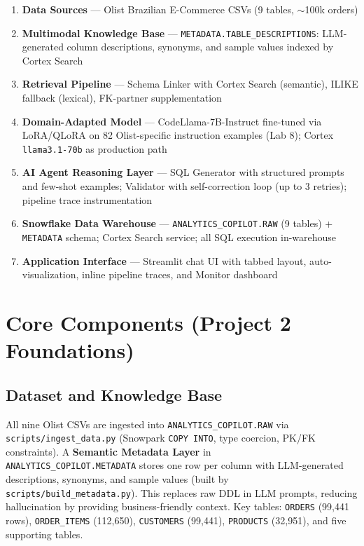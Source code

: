 \documentclass[11pt,letterpaper]{article}
\begin{document}
\begin{enumerate}[nosep, leftmargin=1.5em]
    \item \textbf{Data Sources} --- Olist Brazilian E-Commerce CSVs (9 tables, $\sim$100k orders)
    \item \textbf{Multimodal Knowledge Base} --- \texttt{METADATA.TABLE\_DESCRIPTIONS}: LLM-generated column descriptions, synonyms, and sample values indexed by Cortex Search
    \item \textbf{Retrieval Pipeline} --- Schema Linker with Cortex Search (semantic), ILIKE fallback (lexical), FK-partner supplementation
    \item \textbf{Domain-Adapted Model} --- CodeLlama-7B-Instruct fine-tuned via LoRA/QLoRA on 82 Olist-specific instruction examples (Lab 8); Cortex \texttt{llama3.1-70b} as production path
    \item \textbf{AI Agent Reasoning Layer} --- SQL Generator with structured prompts and few-shot examples; Validator with self-correction loop (up to 3 retries); pipeline trace instrumentation
    \item \textbf{Snowflake Data Warehouse} --- \texttt{ANALYTICS\_COPILOT.RAW} (9 tables) + \texttt{METADATA} schema; Cortex Search service; all SQL execution in-warehouse
    \item \textbf{Application Interface} --- Streamlit chat UI with tabbed layout, auto-visualization, inline pipeline traces, and Monitor dashboard
\end{enumerate}

\section{Core Components (Project 2 Foundations)}

\subsection{Dataset and Knowledge Base}

All nine Olist CSVs are ingested into \texttt{ANALYTICS\_COPILOT.RAW} via \texttt{scripts/ingest\_data.py} (Snowpark \texttt{COPY INTO}, type coercion, PK/FK constraints). A \textbf{Semantic Metadata Layer} in \\ \texttt{ANALYTICS\_COPILOT.METADATA} stores one row per column with LLM-generated descriptions, synonyms, and sample values (built by \texttt{scripts/build\_metadata.py}). This replaces raw DDL in LLM prompts, reducing hallucination by providing business-friendly context. Key tables: \texttt{ORDERS} (99,441 rows), \texttt{ORDER\_ITEMS} (112,650), \texttt{CUSTOMERS} (99,441), \texttt{PRODUCTS} (32,951), and five supporting tables.
\end{document}
